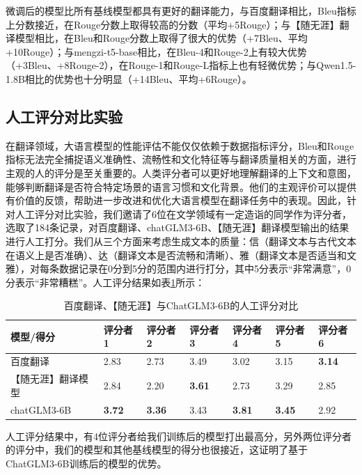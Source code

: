 \documentclass[
    decl-page,  %
    ,fontset = win, %
  ]{njuthesis}
\begin{document}
微调后的模型比所有基线模型都具有更好的翻译能力，与百度翻译相比，Bleu指标上分数接近，在Rouge分数上取得较高的分数（平均+5Rouge）；与【随无涯】翻译模型相比，在Bleu和Rouge分数上取得了很大的优势（+7Bleu、平均+10Rouge）；与mengzi-t5-base相比，在Bleu-4和Rouge-2上有较大优势（+3Bleu、+8Rouge-2），在Rouge-1和Rouge-L指标上也有轻微优势；与Qwen1.5-1.8B相比的优势也十分明显（+14Bleu、平均+6Rouge）。

\subsection{人工评分对比实验}
在翻译领域，大语言模型的性能评估不能仅仅依赖于数据指标评分，Bleu和Rouge指标无法完全捕捉语义准确性、流畅性和文化特征等与翻译质量相关的方面，进行主观的人的评分是至关重要的。人类评分者可以更好地理解翻译的上下文和意图，能够判断翻译是否符合特定场景的语言习惯和文化背景。他们的主观评价可以提供有价值的反馈，帮助进一步改进和优化大语言模型在翻译任务中的表现。因此，针对人工评分对比实验，我们邀请了6位在文学领域有一定造诣的同学作为评分者，选取了184条记录，对百度翻译、chatGLM3-6B、【随无涯】翻译模型输出的结果进行人工打分。我们从三个方面来考虑生成文本的质量：信（翻译文本与古代文本在语义上是否准确）、达（翻译文本是否流畅和清晰）、雅（翻译文本是否适当和文雅），对每条数据记录在0分到5分的范围内进行打分，其中5分表示“非常满意”，0分表示“非常糟糕”。人工评分结果如表\ref{rengong}所示：

\begin{table}[]
\renewcommand\arraystretch{1.5}
\caption{百度翻译、【随无涯】与ChatGLM3-6B的人工评分对比}
\label{rengong}
\begin{tabular}{|l|l|l|l|l|l|l|}
\hline
\textbf{模型/得分} & \textbf{评分者1} & \textbf{评分者2} & \textbf{评分者3} & \textbf{评分者4} & \textbf{评分者5} & \textbf{评分者6} \\ \hline
百度翻译           & 2.83          & 2.73          & 3.49          & 3.02          & 3.15          & \textbf{3.14} \\ \hline
【随无涯】翻译模型      & 2.84          & 2.20          & \textbf{3.61} & 2.73          & 3.29          & 2.85          \\ \hline
chatGLM3-6B    & \textbf{3.72} & \textbf{3.36} & 3.43          & \textbf{3.81} & \textbf{3.45} & 2.92          \\ \hline
\end{tabular}
\end{table}

人工评分结果中，有4位评分者给我们训练后的模型打出最高分，另外两位评分者的评分中，我们的模型和其他基线模型的得分也很接近，这证明了基于ChatGLM3-6B训练后的模型的优势。
\end{document}
